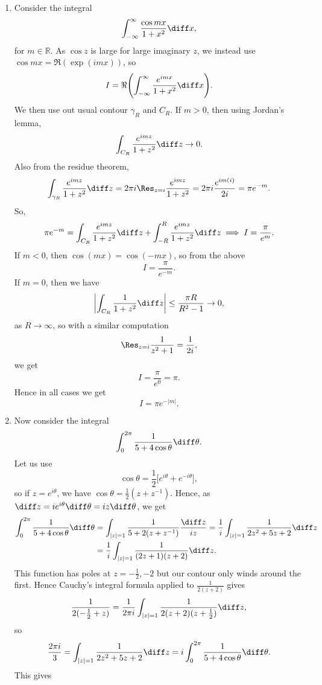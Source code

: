 \documentclass[12pt]{article}
\begin{document}
\begin{exbox}
	\begin{enumerate}
		\item Consider the integral
		\[
			\int_{-\infty}^{\infty} \frac{\cos mx}{1 + x^2}\diff x,
		\]
		for $m \in \mathbb{R}$. As $\cos z$ is large for large imaginary $z$, we instead use $\cos mx = \Re(\exp(imx))$, so
		\[
		I = \Re \Biggl( \int_{-\infty}^{\infty} \frac{e^{imx}}{1 + x^2}\diff x \Biggr).
		\]
		We then use out usual contour $\gamma_R$ and $C_R$. If $m > 0$, then using Jordan's lemma,
		\[
		\int_{C_R} \frac{e^{imz}}{1 + z^2}\diff z \to 0.
		\]
		Also from the residue theorem,
		\[
			\int_{\gamma_R} \frac{e^{imz}}{1 + z^2} \diff z = 2 \pi i \Res_{z = i} \frac{e^{imz}}{1 + z^2} = 2 \pi i \frac{e^{im(i)}}{2i} = \pi e^{-m}.
		\]
		So,
		\[
			\pi e^{-m} = \int_{C_R} \frac{e^{imz}}{1 + z^2}\diff z + \int_{-R}^{R} \frac{e^{imz}}{1 + z^2} \diff z \implies I = \frac{\pi}{e^{m}}.
		\]
		If $m < 0$, then $\cos (mx) = \cos (-mx)$, so from the above
		\[
		I = \frac{\pi}{e^{-m}}.
		\]
		If $m = 0$, then we have
		\[
		\biggl| \int_{C_R} \frac{1}{1 + z^2}\diff z \biggr| \le \frac{\pi R}{R^2 - 1} \to 0,
		\]
		as $R \to \infty$, so with a similar computation
		\[
			\Res_{z=i}\frac{1}{z^2 + 1} = \frac{1}{2i},
		\]
		we get
		\[
		I = \frac{\pi}{e^{0}} = \pi.
		\]
		Hence in all cases we get
		\[
		I = \pi e^{-|m|}.
		\]
	\item Now consider the integral
		\[
			\int_0^{2\pi} \frac{1}{5 + 4 \cos \theta} \diff \theta.
		\]
		Let us use
		\[
			\cos \theta = \frac{1}{2} \bigl[ e^{i\theta} + e^{-i\theta}\bigr],
		\]
		so if $z = e^{i\theta}$, we have $\cos \theta = \frac{1}{2}(z + z^{-1})$. Hence, as $\diff z = i e^{i\theta} \diff \theta = i z\diff \theta$, we get
		\begin{align*}
		\int_0^{2\pi}\frac{1}{5 + 4\cos\theta} \diff \theta &= \int_{|z|=1}\frac{1}{5 + 2(z + z^{-1})} \frac{\diff z}{iz} = \frac{1}{i} \int_{|z|=1} \frac{1}{2z^2 + 5z + 2}\diff z \\
								    &= \frac{1}{i} \int_{|z|=1} \frac{1}{(2z+1)(z+2)}\diff z.
		\end{align*}
		This function has poles at $z=-\frac{1}{2}, -2$ but our contour only winds around the first. Hence Cauchy's integral formula applied to $\frac{1}{2(z+2)}$ gives
		\[
		\frac{1}{2(-\frac{1}{2}+z)} = \frac{1}{2\pi i} \int_{|z|=1}\frac{1}{2(z+2)(z+\frac{1}{2})}\diff z,
		\]
		so
		\[
		\frac{2\pi i}{3} = \int_{|z|=1}\frac{1}{2z^2 + 5z + 2}\diff z = i \int_0^{2\pi}\frac{1}{5 + 4 \cos \theta}\diff \theta.
		\]
		This gives

\end{enumerate}
\end{exbox}
\end{document}
